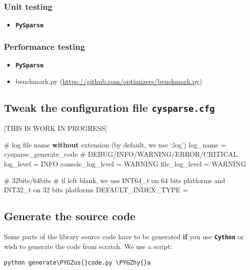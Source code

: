 \documentclass[letterpaper,10pt,english]{sphinxmanual}
\def\PYGZus{\char`\_}
\def\PYGZhy{\char`\-}
\begin{document}
\subsubsection{Unit testing}
\label{installation:unit-testing}\begin{itemize}
\item {} 
\textbf{\texttt{PySparse}}

\end{itemize}


\subsubsection{Performance testing}
\label{installation:performance-testing}\begin{itemize}
\item {} 
\textbf{\texttt{PySparse}}

\item {} 
benchmark.py (\href{https://github.com/optimizers/benchmark.py}{https://github.com/optimizers/benchmark.py})

\end{itemize}


\subsection{Tweak the configuration file \texttt{cysparse.cfg}}
\label{installation:tweak-the-configuration-file-cysparse-cfg}
{[}THIS IS WORK IN PROGRESS{]}

\# log file name \textbf{without} extension (by default, we use `.log')
log\_name = cysparse\_generate\_code
\# DEBUG/INFO/WARNING/ERROR/CRITICAL
log\_level = INFO
console\_log\_level = WARNING
file\_log\_level = WARNING

\# 32bits/64bits
\# if left blank, we use INT64\_t on 64 bits platforms and INT32\_t on 32 bits platforms
DEFAULT\_INDEX\_TYPE =


\subsection{Generate the source code}
\label{installation:generate-the-source-code}
Some parts of the library source code have to be generated \textbf{if} you use \textbf{\texttt{Cython}} or wish to generate the code from scratch. We use a script:

\begin{Verbatim}[commandchars=\\\{\}]
python generate\PYGZus{}code.py \PYGZhy{}a
\end{Verbatim}
\end{document}
